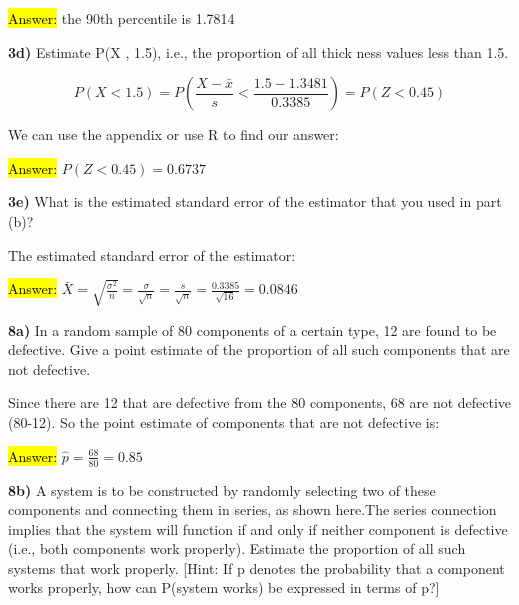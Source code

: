\documentclass{article}
\begin{document}
  \vspace{3mm}
  
\hl{Answer:} the 90th percentile is 1.7814


\vspace{5mm}
\textbf{3d)}  Estimate P(X , 1.5), i.e., the proportion of all thick­ ness values less than 1.5.

\begin{equation}
P(X<1.5) =P(\frac{X-\bar{x}}s <\frac{1.5-1.3481}{0.3385})=P(Z< 0.45)
\end{equation}

We can use the appendix or use R to find our answer: 
\vspace{2mm}

\hl{Answer:} $P(Z< 0.45)=0.6737$
\vspace{5mm}

\textbf{3e)}  What is the estimated standard error of the estimator that you used in part (b)? 
\vspace{2mm}

The estimated standard error of the estimator:
\vspace{3mm}

\hl{Answer:} $\bar{X}=\sqrt{\frac{\sigma^2}{n}}=\frac{\sigma}{\sqrt{n}}=\frac{s}{\sqrt{n}}=\frac{0.3385}{\sqrt{16}}=0.0846$

\newpage

\textbf{8a)} In a random sample of 80 components of a certain type, 12 are found to be defective. Give a point estimate of the proportion of all such components that are not defective. 

Since there are 12 that are defective from the 80 components, 68 are not defective (80-12). So the point estimate of components that are not defective is:

\hl{Answer:} $\hat{p}=\frac{68}{80}=0.85$

\vspace{5mm}

\textbf{8b)} A system is to be constructed by randomly selecting two of these components and connecting them in series, as shown here.The series connection implies that the system will func­tion if and only if neither component is defective (i.e., both components work properly). Estimate the propor­tion of all such systems that work properly. [Hint: If p denotes the probability that a component works properly, how can P(system works) be expressed in terms of p?]
\end{document}
